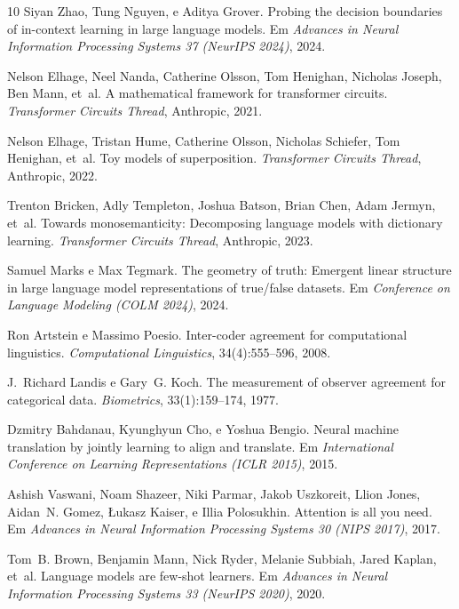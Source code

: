 \documentclass[12pt,a4paper]{article}
\begin{document}
\begin{thebibliography}{10}
Siyan Zhao, Tung Nguyen, e Aditya Grover.
\newblock Probing the decision boundaries of in-context learning in large
  language models.
\newblock Em \emph{Advances in Neural Information Processing Systems 37
  (NeurIPS 2024)}, 2024.

Nelson Elhage, Neel Nanda, Catherine Olsson, Tom Henighan, Nicholas Joseph,
  Ben Mann, et~al.
\newblock A mathematical framework for transformer circuits.
\newblock \emph{Transformer Circuits Thread}, Anthropic, 2021.

Nelson Elhage, Tristan Hume, Catherine Olsson, Nicholas Schiefer, Tom
  Henighan, et~al.
\newblock Toy models of superposition.
\newblock \emph{Transformer Circuits Thread}, Anthropic, 2022.

Trenton Bricken, Adly Templeton, Joshua Batson, Brian Chen, Adam Jermyn,
  et~al.
\newblock Towards monosemanticity: Decomposing language models with
  dictionary learning.
\newblock \emph{Transformer Circuits Thread}, Anthropic, 2023.

Samuel Marks e Max Tegmark.
\newblock The geometry of truth: Emergent linear structure in large language
  model representations of true/false datasets.
\newblock Em \emph{Conference on Language Modeling (COLM 2024)}, 2024.

Ron Artstein e Massimo Poesio.
\newblock Inter-coder agreement for computational linguistics.
\newblock \emph{Computational Linguistics}, 34(4):555--596, 2008.

J.~Richard Landis e Gary~G. Koch.
\newblock The measurement of observer agreement for categorical data.
\newblock \emph{Biometrics}, 33(1):159--174, 1977.

Dzmitry Bahdanau, Kyunghyun Cho, e Yoshua Bengio.
\newblock Neural machine translation by jointly learning to align and
  translate.
\newblock Em \emph{International Conference on Learning Representations (ICLR
  2015)}, 2015.

Ashish Vaswani, Noam Shazeer, Niki Parmar, Jakob Uszkoreit, Llion Jones,
  Aidan~N. Gomez, {\L}ukasz Kaiser, e Illia Polosukhin.
\newblock Attention is all you need.
\newblock Em \emph{Advances in Neural Information Processing Systems 30 (NIPS
  2017)}, 2017.

Tom~B. Brown, Benjamin Mann, Nick Ryder, Melanie Subbiah, Jared Kaplan, et~al.
\newblock Language models are few-shot learners.
\newblock Em \emph{Advances in Neural Information Processing Systems 33
  (NeurIPS 2020)}, 2020.


\end{thebibliography}
\end{document}
